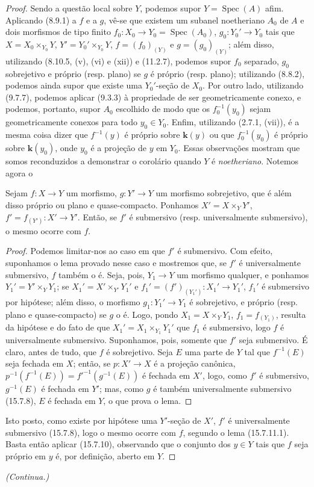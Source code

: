 \begin{proof}
Sendo a questão local sobre $Y$, podemos supor $Y=\operatorname{Spec}(A)$ afim. Aplicando (8.9.1) a $f$ e a $g$, vê-se que existem um subanel noetheriano $A_0$ de $A$ e dois morfismos de tipo finito $f_0:X_0\to Y_0=\operatorname{Spec}(A_0)$, $g_0:Y_0'\to Y_0$ tais que $X=X_0\times_{Y_0}Y$, $Y'=Y_0'\times_{Y_0}Y$, $f=(f_0)_{(Y)}$ e $g=(g_0)_{(Y)}$; além disso, utilizando (8.10.5, (v), (vi) e (xii)) e (11.2.7), podemos supor $f_0$ separado, $g_0$ sobrejetivo e próprio (resp. plano) se $g$ é próprio (resp. plano); utilizando (8.8.2), podemos ainda supor que existe uma $Y_0'$-seção de $X_0$. Por outro lado, utilizando (9.7.7), podemos aplicar (9.3.3) à propriedade de ser geometricamente conexo, e podemos, portanto, supor $A_0$ escolhido de modo que os $f_0^{-1}(y_0)$ sejam geometricamente conexos para todo $y_0\in Y_0$. Enfim, utilizando (2.7.1, (vii)), é a mesma coisa dizer que $f^{-1}(y)$ é próprio sobre $\mathbf k(y)$ ou que $f_0^{-1}(y_0)$ é próprio sobre $\mathbf k(y_0)$, onde $y_0$ é a projeção de $y$ em $Y_0$. Essas observações mostram que somos reconduzidos a demonstrar o corolário quando $Y$ é \emph{noetheriano}. Notemos agora o

\begin{lemma}[15.7.11.1]
\label{IV.15.7.11.1}
Sejam $f:X\to Y$ um morfismo, $g:Y'\to Y$ um morfismo sobrejetivo, que é além disso próprio ou plano e quase-compacto. Ponhamos $X'=X\times_Y Y'$, $f'=f_{(Y')}:X'\to Y'$. Então, se $f'$ é submersivo (resp. universalmente submersivo), o mesmo ocorre com $f$.
\end{lemma}

\begin{proof}
Podemos limitar-nos ao caso em que $f'$ é submersivo. Com efeito, suponhamos o lema provado nesse caso e mostremos que, se $f'$ é universalmente submersivo, $f$ também o é. Seja, pois, $Y_1\to Y$ um morfismo qualquer, e ponhamos $Y_1'=Y'\times_Y Y_1$; se $X_1'=X'\times_{Y'}Y_1'$ e $f_1'=(f')_{(Y_1')}:X_1'\to Y_1'$, $f_1'$ é submersivo por hipótese; além disso, o morfismo $g_1:Y_1'\to Y_1$ é sobrejetivo, e próprio (resp. plano e quase-compacto) se $g$ o é. Logo, pondo $X_1=X\times_Y Y_1$, $f_1=f_{(Y_1)}$, resulta da hipótese e do fato de que $X_1'=X_1\times_{Y_1}Y_1'$ que $f_1$ é submersivo, logo $f$ é universalmente submersivo. Suponhamos, pois, somente que $f'$ seja submersivo. É claro, antes de tudo, que $f$ é sobrejetivo. Seja $E$ uma parte de $Y$ tal que $f^{-1}(E)$ seja fechada em $X$; então, se $p:X'\to X$ é a projeção canônica,
$p^{-1}(f^{-1}(E))=f'^{-1}(g^{-1}(E))$ é fechada em $X'$, logo, como $f'$ é submersivo, $g^{-1}(E)$ é fechada em $Y'$; mas, como $g$ é também universalmente submersivo (15.7.8), $E$ é fechada em $Y$, o que prova o lema.
\end{proof}

Isto posto, como existe por hipótese uma $Y'$-seção de $X'$, $f'$ é universalmente submersivo (15.7.8), logo o mesmo ocorre com $f$, segundo o lema (15.7.11.1). Basta então aplicar (15.7.10), observando que o conjunto dos $y\in Y$ tais que $f$ seja próprio em $y$ é, por definição, aberto em $Y$.
\end{proof}

\begin{center}
\emph{(Continua.)}
\end{center}
